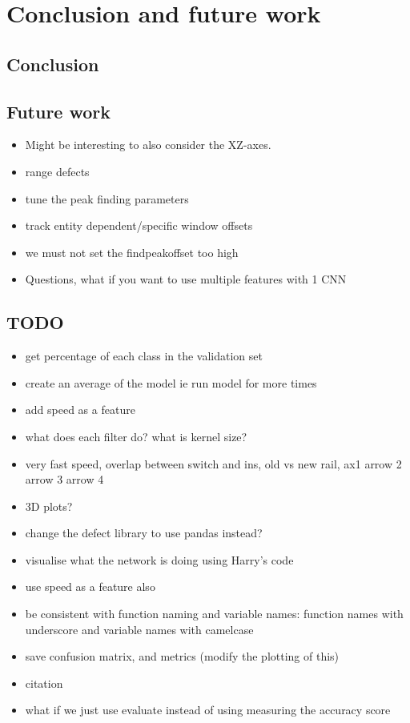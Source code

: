 \chapter{Conclusion and future work}

\section{Conclusion}

\section{Future work}

\begin{itemize}
	\item Might be interesting to also consider the XZ-axes.
	\item range defects
	\item tune the peak finding parameters
	\item track entity dependent/specific window offsets
	\item we must not set the findpeakoffset too high
	\item Questions, what if you want to use multiple features with 1 CNN
	
\end{itemize}

\newpage
\section{TODO}
\begin{itemize}
	\item get percentage of each class in the validation set
	\item create an average of the model ie run model for more times
	\item add speed as a feature
	\item what does each filter do? what is kernel size?
	\item very fast speed, overlap between switch and ins, old vs new rail, ax1 arrow 2 arrow 3 arrow 4
	\item 3D plots?
	\item change the defect library to use pandas instead?
	\item visualise what the network is doing using Harry's code
	\item use speed as a feature also
	\item be consistent with function naming and variable names: function names with underscore and variable names with camelcase
	\item save confusion matrix, and metrics (modify the plotting of this) \item citation \cite{benchmark}
	\item what if we just use evaluate instead of using measuring the accuracy score
\end{itemize}

